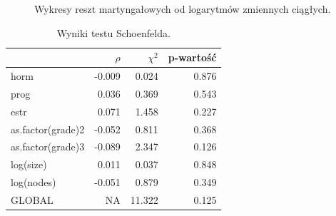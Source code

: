 \documentclass[]{article}
\begin{document}
\begin{figure}[hbt!]
  \vspace{-10pt}
  \begin{center}
  \end{center}
  \vspace{-20pt}
  \label{fig:sc}
  \caption{Wykresy reszt martyngałowych od logarytmów zmiennych ciągłych.}

\end{figure}

\begin{table}
\vspace{-12pt}
\caption{ Wyniki testu Schoenfelda. }
\begin{tabular}{lrrr}
\toprule%
  & $\rho$ & $\chi^2$ & p-wartość\\ \toprule 

horm & -0.009 & 0.024 & 0.876\\

prog & 0.036 & 0.369 & 0.543\\

estr & 0.071 & 1.458 & 0.227\\

as.factor(grade)2 & -0.052 & 0.811 & 0.368\\

as.factor(grade)3 & -0.089 & 2.347 & 0.126\\

log(size) & 0.011 & 0.037 & 0.848\\

log(nodes) & -0.051 & 0.879 & 0.349\\

GLOBAL & NA & 11.322 & 0.125\\  \bottomrule
\end{tabular}
\vspace{-7.5pt}
\end{table}
\end{document}

